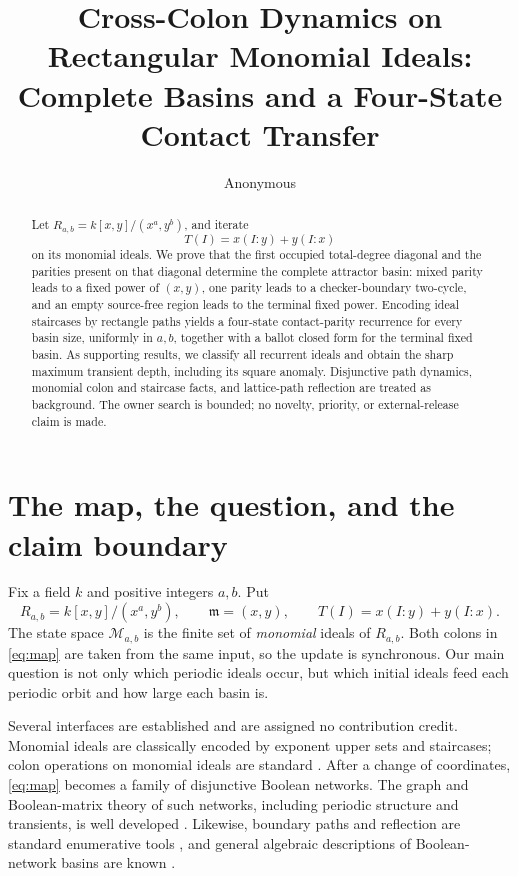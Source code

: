 \documentclass[10pt,a4paper]{amsart}
\title[Cross-colon monomial-ideal basins]{Cross-Colon Dynamics on Rectangular Monomial Ideals:\\
Complete Basins and a Four-State Contact Transfer}
\author{Anonymous}
\date{}
\theoremstyle{definition}
\theoremstyle{remark}
\newcommand{\mm}{\mathfrak m}
\newcommand{\Mcal}{\mathcal M}
\begin{document}
\begin{abstract}
Let \(R_{a,b}=k[x,y]/(x^a,y^b)\), and iterate
\[
                        T(I)=x(I:y)+y(I:x)
\]
on its monomial ideals.  We prove that the first occupied total-degree
diagonal and the parities present on that diagonal determine the complete
attractor basin: mixed parity leads to a fixed power of \((x,y)\), one
parity leads to a checker-boundary two-cycle, and an empty source-free region
leads to the terminal fixed power.  Encoding ideal staircases by rectangle
paths yields a four-state contact-parity recurrence for every basin size,
uniformly in \(a,b\), together with a ballot closed form for the terminal
fixed basin.  As supporting results, we classify all recurrent ideals and
obtain the sharp maximum transient depth, including its square anomaly.
Disjunctive path dynamics, monomial colon and staircase facts, and
lattice-path reflection are treated as background.  The owner search is
bounded; no novelty, priority, or external-release claim is made.
\end{abstract}

\maketitle

\section{The map, the question, and the claim boundary}

Fix a field \(k\) and positive integers \(a,b\).  Put
\[
 R_{a,b}=k[x,y]/(x^a,y^b),\qquad
 \mm=(x,y),
 \qquad
 T(I)=x(I:y)+y(I:x).                                      \tag{1.1}\label{eq:map}
\]
The state space \(\Mcal_{a,b}\) is the finite set of \emph{monomial} ideals
of \(R_{a,b}\).  Both colons in \eqref{eq:map} are taken from the same input,
so the update is synchronous.  Our main question is not only which periodic
ideals occur, but which initial ideals feed each periodic orbit and how large
each basin is.

Several interfaces are established and are assigned no contribution credit.
Monomial ideals are classically encoded by exponent upper sets and
staircases; colon operations on monomial ideals are standard
\cite{MillerSturmfels2005,AmbhoreSengupta2024}.  After a change of
coordinates, \eqref{eq:map} becomes a family of disjunctive Boolean networks.
The graph and Boolean-matrix theory of such networks, including periodic
structure and transients, is well developed
\cite{GolesHernandez2000,JarrahLaubenbacherVelizCuba2010,Gadouleau2021}.
Likewise, boundary paths and reflection are standard enumerative tools
\cite{Stanley2012}, and general algebraic descriptions of Boolean-network
basins are known \cite{AustinDinwoodie2015}.
\end{document}
